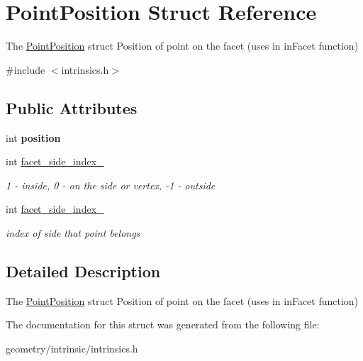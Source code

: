 \hypertarget{struct_point_position}{}\section{Point\+Position Struct Reference}
\label{struct_point_position}


The \mbox{\hyperlink{struct_point_position}{Point\+Position}} struct Position of point on the facet (uses in \textquotesingle{}in\+Facet\textquotesingle{} function)  




{\ttfamily \#include $<$intrinsics.\+h$>$}

\subsection*{Public Attributes}
\begin{DoxyCompactItemize}
\item 
\mbox{\label{struct_point_position_a320fb9b9bc5e1a81131c234e879eb728}} 
int {\bfseries position}
\item 
\mbox{\label{struct_point_position_aba9abb7274be46364676e7152e626e69}} 
int \mbox{\hyperlink{struct_point_position_aba9abb7274be46364676e7152e626e69}{facet\+\_\+side\+\_\+index\+\_}}
\begin{DoxyCompactList}\small\item\em 1 -\/ inside, 0 -\/ on the side or vertex, -\/1 -\/ outside \end{DoxyCompactList}\item 
\mbox{\label{struct_point_position_a566b3fefc1400a64d2015a2b7f1ea396}} 
int \mbox{\hyperlink{struct_point_position_a566b3fefc1400a64d2015a2b7f1ea396}{facet\+\_\+side\+\_\+index\+\_}}
\begin{DoxyCompactList}\small\item\em index of side that point belongs \end{DoxyCompactList}\end{DoxyCompactItemize}


\subsection{Detailed Description}
The \mbox{\hyperlink{struct_point_position}{Point\+Position}} struct Position of point on the facet (uses in \textquotesingle{}in\+Facet\textquotesingle{} function) 

The documentation for this struct was generated from the following file\+:\begin{DoxyCompactItemize}
\item 
geometry/intrinsic/intrinsics.\+h\end{DoxyCompactItemize}
